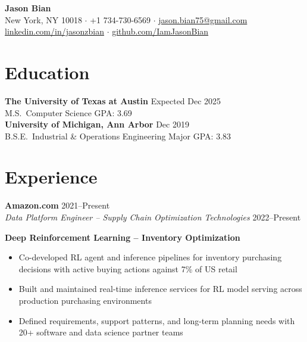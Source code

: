 \documentclass[10pt,letterpaper]{article}
\begin{document}
\begin{center}
  {\LARGE\bfseries Jason Bian}\\[4pt]
  New York, NY 10018 \quad
  $\cdot$ \quad +1 734-730-6569 \quad
  $\cdot$ \quad \href{mailto:jason.bian75@gmail.com}{jason.bian75@gmail.com}\\[2pt]
  \href{https://www.linkedin.com/in/jasonzbian/}{linkedin.com/in/jasonzbian} \quad
  $\cdot$ \quad
  \href{https://github.com/IamJasonBian}{github.com/IamJasonBian}
\end{center}

\section{Education}

\textbf{The University of Texas at Austin} \hfill Expected Dec 2025\\
M.S.\ Computer Science \hfill GPA: 3.69\\[6pt]

\textbf{University of Michigan, Ann Arbor} \hfill Dec 2019\\
B.S.E.\ Industrial \& Operations Engineering \hfill Major GPA: 3.83

\section{Experience}

\textbf{Amazon.com} \hfill 2021--Present\\[2pt]
\textit{Data Platform Engineer -- Supply Chain Optimization Technologies} \hfill 2022--Present

\vspace{2pt}
\textbf{Deep Reinforcement Learning -- Inventory Optimization}
\begin{itemize}
  \item Co-developed RL agent and inference pipelines for inventory purchasing decisions with active buying actions against 7\% of US retail
  \item Built and maintained real-time inference services for RL model serving across production purchasing environments
  \item Defined requirements, support patterns, and long-term planning needs with 20+ software and data science partner teams
\end{itemize}
\end{document}
